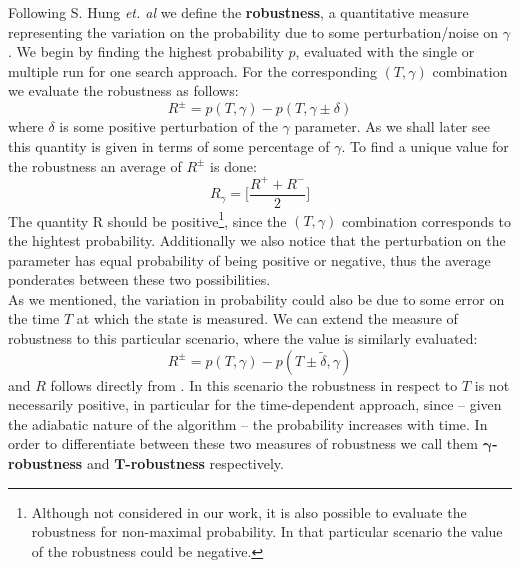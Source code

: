        Following S. Hung \textit{et. al} \cite{SH.HungS.Hietala2019} we define the \textbf{robustness}, a quantitative measure representing the variation on the probability due to some perturbation/noise on $\gamma$.
        We begin by finding the highest probability $p$, evaluated with the single or multiple run for one search approach. For the corresponding $(T,\gamma)$ combination we evaluate the robustness as follows:
        \begin{equation}
            R ^\pm = p(T, \gamma) - p(T, \gamma \pm \delta)
        \end{equation}
        where $\delta$ is some positive perturbation of the $\gamma$ parameter. As we shall later see this quantity is given in terms of some percentage of $\gamma$. To find a unique value for the robustness an average of $R^\pm$ is done:
        \begin{equation}
            R_\gamma = \bigg[\frac{R^++ R^-}{2}\bigg]
            \label{eq:robustness}
        \end{equation}
        The quantity R should be positive\footnote{ Although not considered in our work, it is also possible to evaluate the robustness for non-maximal probability. In that particular scenario the value of the robustness could be negative.}, since the $(T,\gamma)$ combination corresponds to the hightest probability. Additionally we also notice that the perturbation on the parameter has equal probability of being positive or negative, thus the average ponderates between these two possibilities. \\

        \noindent
        As we mentioned, the variation in probability could also be due to some error on the time $T$ at which the state is measured. We can extend the measure of robustness to this particular scenario, where the value is similarly evaluated:
        \begin{equation}
            R^{\pm} = p(T, \gamma) - p(T \pm \tilde{\delta}, \gamma )
        \end{equation}
        and $R$ follows directly from . In this scenario the robustness in respect to $T$ is not necessarily positive, in particular for the time-dependent approach, since -- given the adiabatic nature of the algorithm -- the probability increases with time.
        In order to differentiate between these two measures of robustness we call them \textbf{$\bm{\gamma}$-robustness} and \textbf{$\bm{T}$-robustness} respectively.


